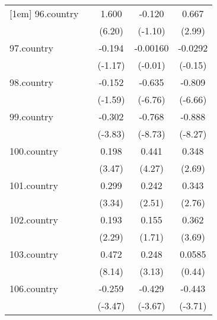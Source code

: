 {\begin{tabular}{l*{4}{c}}
[1em]
96.country  &                     &       1.600\sym{***}&      -0.120         &       0.667\sym{**} \\
            &                     &      (6.20)         &     (-1.10)         &      (2.99)         \\
[1em]
97.country  &                     &      -0.194         &    -0.00160         &     -0.0292         \\
            &                     &     (-1.17)         &     (-0.01)         &     (-0.15)         \\
[1em]
98.country  &                     &      -0.152         &      -0.635\sym{***}&      -0.809\sym{***}\\
            &                     &     (-1.59)         &     (-6.76)         &     (-6.66)         \\
[1em]
99.country  &                     &      -0.302\sym{***}&      -0.768\sym{***}&      -0.888\sym{***}\\
            &                     &     (-3.83)         &     (-8.73)         &     (-8.27)         \\
[1em]
100.country &                     &       0.198\sym{***}&       0.441\sym{***}&       0.348\sym{**} \\
            &                     &      (3.47)         &      (4.27)         &      (2.69)         \\
[1em]
101.country &                     &       0.299\sym{***}&       0.242\sym{*}  &       0.343\sym{**} \\
            &                     &      (3.34)         &      (2.51)         &      (2.76)         \\
[1em]
102.country &                     &       0.193\sym{*}  &       0.155         &       0.362\sym{***}\\
            &                     &      (2.29)         &      (1.71)         &      (3.69)         \\
[1em]
103.country &                     &       0.472\sym{***}&       0.248\sym{**} &      0.0585         \\
            &                     &      (8.14)         &      (3.13)         &      (0.44)         \\
[1em]
106.country &                     &      -0.259\sym{***}&      -0.429\sym{***}&      -0.443\sym{***}\\
            &                     &     (-3.47)         &     (-3.67)         &     (-3.71)         \\

\end{tabular}}
